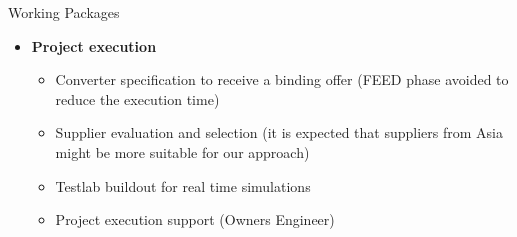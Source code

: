 \begin{frame}{Working Packages}
  \begin{itemize}
  \setlength{\itemsep}{0.5em}
  \item \textbf{Project execution}
    \begin{itemize}
      \item Converter specification to receive a binding offer (FEED phase avoided to reduce the execution time)
      \item Supplier evaluation and selection (it is expected that suppliers from Asia might be more suitable for our approach)
      \item Testlab buildout for real time simulations
      \item Project execution support (Owners Engineer)
    \end{itemize}
\end{itemize}
\end{frame}